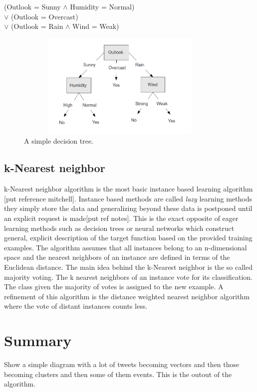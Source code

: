 \begin{center}
  (Outlook = Sunny $\wedge$ Humidity = Normal)\\
  $\vee$ (Outlook = Overcast)\\
  $\vee$ (Outlook = Rain $\wedge$ Wind = Weak)
\end{center}

\begin{figure}[!htbp]
  \begin{center}
    \includegraphics[height=2in, width=4in]{decision-tree-example}
    \caption{A simple decision tree.}
    \label{DecisionTreeExample}
  \end{center}
\end{figure} 

\subsection{k-Nearest neighbor}
k-Nearest neighbor algorithm is the most basic instance based learning algorithm [put reference mitchell]. Instance based methods are called \emph{lazy} learning methods they simply store the data and generalizing beyond these data is postponed until an explicit request is made[put ref notes]. This is the exact opposite of eager learning methods such as decision trees or neural networks which construct general, explicit description of the target function based on the provided training examples. The algorithm assumes that all instances belong to an n-dimensional space and the nearest neighbors of an instance are defined in terms of the Euclidean distance. The main idea behind the k-Nearest neighbor is the so called majority voting. The k nearest neighbors of an instance vote for its classification. The class given the majority of votes is assigned to the new example. A refinement of this algorithm is the distance weighted nearest neighbor algorithm where the vote of distant instances counts less.  

\section{Summary}

Show a simple diagram with a lot of tweets becoming vectors and then those becoming clusters and then some of them events.
This is the outout of the algorithm.



